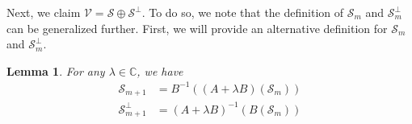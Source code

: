 \documentclass{article}
\newtheorem{lemma}[theorem]{Lemma}
\newcommand{\0}{\mathbf{0}}
\renewcommand{\vec}{\mathbf}
\newcommand{\vv}{\vec{v}}
\newcommand{\inv}{^{-1}}
\newcommand{\C}{\mathbb{C}}
\newcommand{\vecspace}[1]{\mathcal{#1}}
\newcommand{\vsV}{\vecspace{V}}
\newcommand{\vsS}{\vecspace{S}}
\newcommand{\vsSp}{\vecspace{S}^\perp}
\begin{document}
Next, we claim $\vsV=\vsS\oplus\vsSp$.
To do so, we note that the definition of $\vsS_m$ and $\vsSp_m$ can be generalized further.
First, we will provide an alternative definition for $\vsS_m$ and $\vsSp_m$.
\begin{lemma}
    \label{lemma:alt_def_2}
    For any $\lambda \in \C$, we have
    \begin{align*}
        \vsS_{m+1} &= B\inv((A+\lambda B)(\vsS_m))\\
        \vsSp_{m+1} &= (A+\lambda B)\inv(B(\vsS_m))\\
    \end{align*}
\end{lemma}
\end{document}
